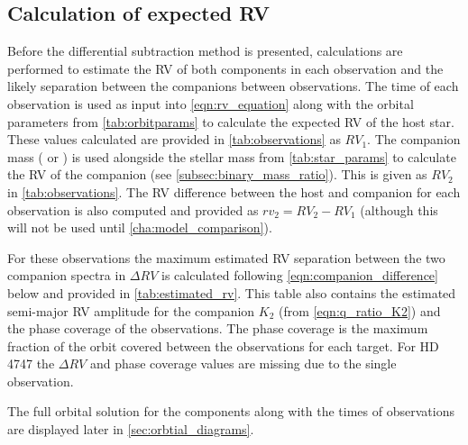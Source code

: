 
\subsection{Calculation of expected {RV}}

Before the differential subtraction method is presented, calculations are performed to estimate the {RV} of both components in each observation and the likely separation between the companions between observations.
The time of each observation is used as input into \cref{eqn:rv_equation} along with the orbital parameters from \cref{tab:orbitparams} to calculate the expected {RV} of the host star.
These values calculated are provided in \cref{tab:observations} as \({RV}_{1}\).
The companion mass (\Mtwo{} or \Mtwosini{}) is used alongside the stellar mass from \cref{tab:star_params} to calculate the {RV} of the companion (see \cref{subsec:binary_mass_ratio}).
This is given as \({RV}_{2}\) in \cref{tab:observations}.
The {RV} difference between the host and companion for each observation is also computed and provided as \({rv}_{2} = {RV}_{2}-{RV}_{1}\) (although this will not be used until \cref{cha:model_comparison}).

For these observations the maximum estimated {RV} separation between the two companion spectra in \(\Delta {RV}\) is calculated following \cref{eqn:companion_difference} below and provided in \cref{tab:estimated_rv}.
This table also contains the estimated semi-major {RV} amplitude for the companion \(K_2\) (from \cref{eqn:q_ratio_K2}) and the phase coverage of the observations.
The phase coverage is the maximum fraction of the orbit covered between the observations for each target.
For {HD\,4747} the \(\Delta {RV}\) and phase coverage values are missing due to the single observation.




The full orbital solution for the components along with the times of observations are displayed later in \cref{sec:orbtial_diagrams}.



